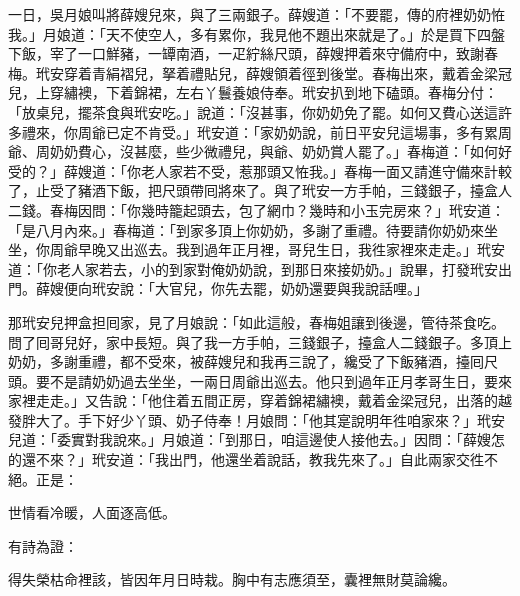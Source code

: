 一日，吳月娘叫將薛嫂兒來，與了三兩銀子。{}薛嫂道：「不要罷，傳的府裡奶奶恠我。」月娘道：「天不使空人，多有累你，我見他不題出來就是了。」於是買下四盤下飯，宰了一口鮮豬，一罈南酒，一疋紵絲尺頭，薛嫂押着來守備府中，致謝春梅。玳安穿着青絹褶兒，拏着禮貼兒，薛嫂領着徑到後堂。春梅出來，戴着金梁冠兒，上穿繡襖，下着錦裙，左右丫鬟養娘侍奉。玳安扒到地下磕頭。春梅分付：「放桌兒，擺茶食與玳安吃。」說道：「沒甚事，你奶奶免了罷。如何又費心送這許多禮來，你周爺已定不肯受。」玳安道：「家奶奶說，前日平安兒這場事，多有累周爺、周奶奶費心，沒甚麼，些少微禮兒，與爺、奶奶賞人罷了。」春梅道：「如何好受的？」薛嫂道：「你老人家若不受，惹那頭又恠我。」春梅一面又請進守備來計較了，止受了豬酒下飯，把尺頭帶囘將來了。與了玳安一方手帕，三錢銀子，擡盒人二錢。春梅因問：「你幾時籠起頭去，包了網巾？幾時和小玉完房來？」{}玳安道：「是八月內來。」春梅道：「到家多頂上你奶奶，多謝了重禮。待要請你奶奶來坐坐，你周爺早晚又出巡去。我到過年正月裡，哥兒生日，我徃家裡來走走。」玳安道：「你老人家若去，小的到家對俺奶奶說，到那日來接奶奶。」說畢，打發玳安出門。薛嫂便向玳安說：「大官兒，你先去罷，奶奶還要與我說話哩。」

那玳安兒押盒担囘家，見了月娘說：「如此這般，春梅姐讓到後邊，管待茶食吃。問了囘哥兒好，家中長短。與了我一方手帕，三錢銀子，擡盒人二錢銀子。多頂上奶奶，多謝重禮，都不受來，被薛嫂兒和我再三說了，纔受了下飯豬酒，擡囘尺頭。要不是請奶奶過去坐坐，一兩日周爺出巡去。他只到過年正月孝哥生日，要來家裡走走。」又告說：「他住着五間正房，穿着錦裙繡襖，戴着金梁冠兒，出落的越發胖大了。手下好少丫頭、奶子侍奉！月娘問：「他其寔說明年徃咱家來？」{}玳安兒道：「委實對我說來。」月娘道：「到那日，咱這邊使人接他去。」因問：「薛嫂怎的還不來？」玳安道：「我出門，他還坐着說話，教我先來了。」自此兩家交徃不絕。正是：

世情看冷暖，人面逐高低。

有詩為證：

得失榮枯命裡該，皆因年月日時栽。胸中有志應須至，囊裡無財莫論纔。

